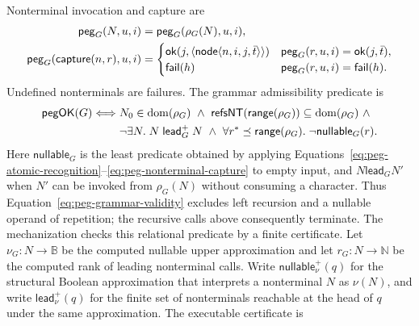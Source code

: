 Nonterminal invocation and capture are
\begin{equation}\label{eq:peg-nonterminal-capture}
\begin{aligned}
 \mathsf{peg}_{G}(N,u,i)&=\mathsf{peg}_{G}(\rho_G(N),u,i),\\
 \mathsf{peg}_{G}(\mathsf{capture}(n,r),u,i)&=
  \begin{cases}
   \mathsf{ok}(j,\langle\mathsf{node}\langle n,i,j,\bar t\rangle\rangle)&
      \mathsf{peg}_{G}(r,u,i)=\mathsf{ok}(j,\bar t),\\
   \mathsf{fail}(h)&\mathsf{peg}_{G}(r,u,i)=\mathsf{fail}(h).
  \end{cases}
\end{aligned}
\end{equation}
Undefined nonterminals are failures.  The grammar admissibility predicate is
\begin{equation}\label{eq:peg-grammar-validity}
\begin{split}
 \mathsf{pegOK}(G)\Longleftrightarrow{}&
 N_0\in\mathop{\mathrm{dom}}(\rho_G)\ \land\
 \mathsf{refsNT}(\mathsf{range}(\rho_G))\subseteq\mathop{\mathrm{dom}}(\rho_G)\ \land\\
 &\neg\exists N.\;N\mathrel{\mathsf{lead}_{G}^{+}}N\ \land\
 \forall r^{*}\preceq\mathsf{range}(\rho_G).\;\neg\mathsf{nullable}_{G}(r).
\end{split}
\end{equation}
Here $\mathsf{nullable}_{G}$ is the least predicate obtained by applying
Equations~\eqref{eq:peg-atomic-recognition}--\eqref{eq:peg-nonterminal-capture}
to empty input, and $N\mathrel{\mathsf{lead}_{G}}N'$ when $N'$ can be invoked
from $\rho_G(N)$ without consuming a character.  Thus
Equation~\eqref{eq:peg-grammar-validity} excludes left recursion and a nullable
operand of repetition; the recursive calls above consequently terminate.
The mechanization checks this relational predicate by a finite certificate.
Let $\nu_G:N\to\mathbb B$ be the computed nullable upper approximation and
let $r_G:N\to\mathbb N$ be the computed rank of leading nonterminal calls.
Write $\mathsf{nullable}^{+}_{\nu}(q)$ for the structural Boolean
approximation that interprets a nonterminal $N$ as $\nu(N)$, and write
$\mathsf{lead}^{+}_{\nu}(q)$ for the finite set of nonterminals reachable at
the head of $q$ under the same approximation.  The executable certificate is


